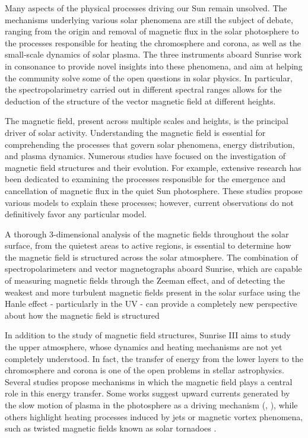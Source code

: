 Many aspects of the physical processes driving our Sun remain unsolved. The mechanisms underlying various solar phenomena are still the subject of debate, ranging from the origin and removal of magnetic flux in the solar photosphere to the processes responsible for heating the chromosphere and corona, as well as the small-scale dynamics of solar plasma. The three instruments aboard Sunrise work in consonance to provide novel insights into these phenomena, and aim at helping the community solve some of the open questions in solar physics. In particular, the spectropolarimetry carried out in different spectral ranges allows for the deduction of the structure of the vector magnetic field at different heights. 

The magnetic field, present across multiple scales and heights, is the principal driver of solar activity. Understanding the magnetic field is essential for comprehending the processes that govern solar phenomena, energy distribution, and plasma dynamics. Numerous studies have focused on the investigation of magnetic field structures and their evolution. For example, extensive research has been dedicated to examining the processes responsible for the emergence and cancellation of magnetic flux in the quiet Sun photosphere. These studies propose various models to explain these processes; however, current observations do not definitively favor any particular model.

A thorough 3-dimensional analysis of the magnetic fields throughout the solar surface, from the quietest areas to active regions, is essential to determine how the magnetic field is structured across the solar atmosphere. The combination of spectropolarimeters and vector magnetographs aboard Sunrise, which are capable of measuring magnetic fields through the Zeeman effect, and of detecting the weakest and more turbulent \citep{quiet_sun_living_review} magnetic fields present in the solar surface using the Hanle effect - particularly in the UV - can provide a completely new perspective about how the magnetic field is structured 

In addition to the study of magnetic field structures, Sunrise III aims to study the upper atmosphere, whose dynamics and heating mechanisms are not yet completely understood. In fact, the transfer of energy from the lower layers to the chromosphere and corona is one of the open problems in stellar astrophysics. Several studies propose mechanisms in which the magnetic field plays a central role in this energy transfer. Some works suggest upward currents generated by the slow motion of plasma in the photosphere as a driving mechanism (\citealt{upwards1}, \citealt{upwards2}), while others highlight heating processes induced by jets \citep{jetscorona} or magnetic vortex phenomena, such as twisted magnetic fields known as solar tornadoes \citep{solar_tornadoes}.

